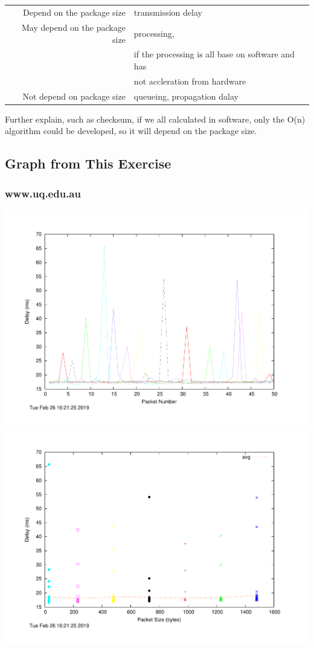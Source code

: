 \documentclass{article}
\begin{document}
\subsection{}
\begin{tabular}{|r|l|}
Depend on the package size& transmission delay\\
May depend on the package size& processing, \\
& if the processing is all base on software and has \\
&not accleration from hardware\\
Not depend on package size& {queueing, propagation} dalay\\
\end{tabular}

Further explain, such as checksum, if we all calculated in software, only the O(n) algorithm could be developed, so it will depend on the package size.

\subsection{Graph from This Exercise}
\subsubsection{www.uq.edu.au}
\includegraphics[width=\textwidth]{uq_delay.pdf}
\includegraphics[width=\textwidth]{uq_scatter.pdf}
\end{document}
